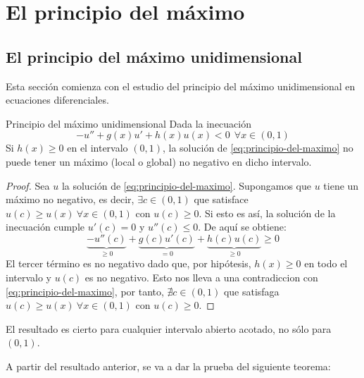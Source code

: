\section{El principio del máximo}
\subsection{El principio del máximo unidimensional}

Esta sección comienza con el estudio del principio del máximo unidimensional en ecuaciones diferenciales.
\begin{mathresult}{Principio del máximo unidimensional}
Dada la inecuación 
\begin{equation}
\label{eq:principio-del-maximo}
-u''+g(x)u'+h(x)u(x) < 0 \ \ \forall x \in (0,1) 
\end{equation}
Si $h(x) \ge 0$ en el intervalo $(0,1)$, la solución de \eqref{eq:principio-del-maximo} no puede tener un máximo (local o global) no negativo en dicho intervalo.
\end{mathresult}
\begin{proof}
Sea $u$ la solución de \eqref{eq:principio-del-maximo}. Supongamos que $u$ tiene un máximo no negativo, es decir, $\exists c\in (0,1)$ que satisface $u(c) \ge u(x) \ \forall x \in (0,1)$ con $u(c)\ge 0$.
Si esto es así, la solución de la inecuación cumple $u'(c)=0$ y $u''(c) \le 0$. De aquí se obtiene:
$$\underbrace{-u''(c)}_{\ge 0}+\underbrace{g(c)u'(c)}_{=0}+\underbrace{h(c)u(c)}_{\ge 0} \ge 0$$
El tercer término es no negativo dado que, por hipótesis, $h(x) \ge 0$ en todo el intervalo y $u(c)$ es no negativo.
Esto nos lleva a una contradiccion con \eqref{eq:principio-del-maximo}, por tanto, $\nexists c \in (0,1)$ que satisfaga $u(c) \ge u(x) \ \forall x \in (0,1)$ con $u(c)\ge 0$.
\end{proof}
\see El resultado es cierto para cualquier intervalo abierto acotado, no sólo para $(0,1)$.

A partir del resultado anterior, se va a dar la prueba del siguiente teorema:

